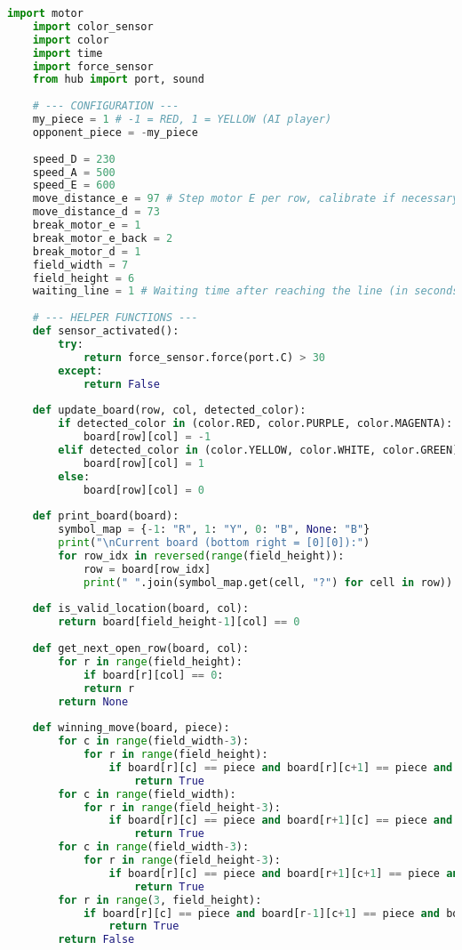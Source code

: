 \setcounter{chapter}{1}

\begin{lstlisting}[language=Python]
	import motor
	import color_sensor
	import color
	import time
	import force_sensor
	from hub import port, sound
	
	# --- CONFIGURATION ---
	my_piece = 1 # -1 = RED, 1 = YELLOW (AI player)
	opponent_piece = -my_piece
	
	speed_D = 230
	speed_A = 500
	speed_E = 600
	move_distance_e = 97 # Step motor E per row, calibrate if necessary!
	move_distance_d = 73
	break_motor_e = 1
	break_motor_e_back = 2
	break_motor_d = 1
	field_width = 7
	field_height = 6
	waiting_line = 1 # Waiting time after reaching the line (in seconds)
	
	# --- HELPER FUNCTIONS ---
	def sensor_activated():
		try:   
			return force_sensor.force(port.C) > 30
		except:
			return False
		
	def update_board(row, col, detected_color):
		if detected_color in (color.RED, color.PURPLE, color.MAGENTA):
			board[row][col] = -1
		elif detected_color in (color.YELLOW, color.WHITE, color.GREEN):
			board[row][col] = 1
		else:
			board[row][col] = 0
	
	def print_board(board):
		symbol_map = {-1: "R", 1: "Y", 0: "B", None: "B"} 
		print("\nCurrent board (bottom right = [0][0]):")
		for row_idx in reversed(range(field_height)):
			row = board[row_idx]
			print(" ".join(symbol_map.get(cell, "?") for cell in row))
		
	def is_valid_location(board, col):
		return board[field_height-1][col] == 0
	
	def get_next_open_row(board, col):
		for r in range(field_height):
			if board[r][col] == 0:
			return r
		return None
	
	def winning_move(board, piece):
		for c in range(field_width-3):
			for r in range(field_height):
				if board[r][c] == piece and board[r][c+1] == piece and board[r][c+2] == piece and board[r][c+3] == piece:
					return True
		for c in range(field_width):
			for r in range(field_height-3):
				if board[r][c] == piece and board[r+1][c] == piece and board[r+2][c] == piece and board[r+3][c] == piece:
					return True
		for c in range(field_width-3):
			for r in range(field_height-3):
				if board[r][c] == piece and board[r+1][c+1] == piece and board[r+2][c+2] == piece and board[r+3][c+3] == piece:
					return True
		for r in range(3, field_height):
			if board[r][c] == piece and board[r-1][c+1] == piece and board[r-2][c+2] == piece and board[r-3][c+3] == piece:
				return True	
		return False
	

\end{lstlisting}
